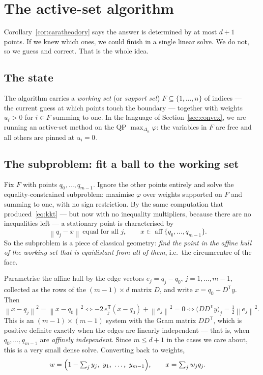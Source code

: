\documentclass[11pt,a4paper]{article}
\theoremstyle{plain}
\theoremstyle{definition}
\theoremstyle{remark}
\DeclareMathOperator{\aff}{aff}
\newcommand{\norm}[1]{\left\lVert #1 \right\rVert}
\newcommand{\simplex}{\Delta_n}
\newcommand{\transpose}{^{\mathsf{T}}}
\begin{document}
\section{The active-set algorithm}
\label{sec:algorithm}

Corollary~\ref{cor:caratheodory} says the answer is determined by at most $d+1$
points. If we knew which ones, we could finish in a single linear solve. We do
not, so we guess and correct. That is the whole idea.

\subsection{The state}

The algorithm carries a \emph{working set} (or \emph{support set}) $F\subseteq
\{1,\dots,n\}$ of indices --- the current guess at which points touch the
boundary --- together with weights $u_i>0$ for $i\in F$ summing to one. In the
language of Section~\ref{sec:convex}, we are running an active-set method on the
QP $\max_{\simplex}\varphi$: the variables in $F$ are free and all others are
pinned at $u_i=0$.

\subsection{The subproblem: fit a ball to the working set}

Fix $F$ with points $q_0,\dots,q_{m-1}$. Ignore the other points entirely and
solve the equality-constrained subproblem: maximise $\varphi$ over weights
supported on $F$ and summing to one, with no sign restriction. By the same
computation that produced~\eqref{eq:kkt} --- but now with no inequality
multipliers, because there are no inequalities left --- a stationary point is
characterised by
\[
  \norm{q_j - x} \ \text{equal for all } j, \qquad x \in \aff\{q_0,\dots,q_{m-1}\} .
\]
So the subproblem is a piece of classical geometry: \emph{find the point in the
affine hull of the working set that is equidistant from all of them}, i.e.\ the
circumcentre of the face.

Parametrise the affine hull by the edge vectors $e_j = q_j - q_0$, $j=1,\dots,m-1$,
collected as the rows of the $(m-1)\times d$ matrix $D$, and write
$x = q_0 + D\transpose y$. Then
\[
  \norm{x-q_j}^2 = \norm{x-q_0}^2
  \iff -2\,e_j\transpose(x-q_0) + \norm{e_j}^2 = 0
  \iff \bigl(D D\transpose y\bigr)_j = \tfrac12 \norm{e_j}^2 .
\]
This is an $(m-1)\times(m-1)$ system with the Gram matrix $DD\transpose$, which is
positive definite exactly when the edges are linearly independent --- that is,
when $q_0,\dots,q_{m-1}$ are \emph{affinely independent}. Since $m\le d+1$ in the
cases we care about, this is a very small dense solve. Converting back to weights,
\begin{equation}
  \label{eq:face-weights}
  w = \Bigl(1 - \textstyle\sum_j y_j,\ y_1,\ \dots,\ y_{m-1}\Bigr),
  \qquad x = \sum_j w_j q_j .
\end{equation}
\end{document}
